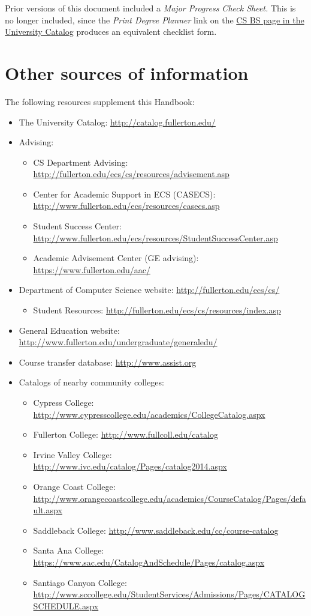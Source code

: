 \documentclass{book}
\begin{document}
Prior versions of this document included a \emph{Major Progress Check Sheet.} This is no longer included, since the \emph{Print Degree Planner} link on the \href{http://catalog.fullerton.edu/preview_program.php?catoid=2&poid=537&returnto=137}{CS BS page in the University Catalog} produces an equivalent checklist form.

\chapter{Other sources of information}

The following resources supplement this Handbook:
\begin{itemize}
\item The University Catalog: \url{http://catalog.fullerton.edu/}
\item Advising:
  \begin{itemize}
    \item CS Department Advising: \url{http://fullerton.edu/ecs/cs/resources/advisement.asp}
  \item Center for Academic Support in ECS (CASECS): \url{http://www.fullerton.edu/ecs/resources/casecs.asp}
  \item Student Success Center: \url{http://www.fullerton.edu/ecs/resources/StudentSuccessCenter.asp}
    \item Academic Advisement Center (GE advising): \url{https://www.fullerton.edu/aac/}
    \end{itemize}
\item Department of Computer Science website: \url{http://fullerton.edu/ecs/cs/}
  \begin{itemize}
  \item Student Resources: \url{http://fullerton.edu/ecs/cs/resources/index.asp}
  \end{itemize}
\item General Education website: \url{http://www.fullerton.edu/undergraduate/generaledu/}
\item Course transfer database: \url{http://www.assist.org}
\item Catalogs of nearby community colleges:
  \begin{itemize}
    \item Cypress College: \url{http://www.cypresscollege.edu/academics/CollegeCatalog.aspx}
    \item Fullerton College: \url{http://www.fullcoll.edu/catalog}
    \item Irvine Valley College: \url{http://www.ivc.edu/catalog/Pages/catalog2014.aspx}
    \item Orange Coast College: \url{http://www.orangecoastcollege.edu/academics/CourseCatalog/Pages/default.aspx}
    \item Saddleback College: \url{http://www.saddleback.edu/cc/course-catalog}
    \item Santa Ana College: \url{https://www.sac.edu/CatalogAndSchedule/Pages/catalog.aspx}
    \item Santiago Canyon College: \url{http://www.sccollege.edu/StudentServices/Admissions/Pages/CATALOGSCHEDULE.aspx}
  \end{itemize}
\end{itemize}
\end{document}
